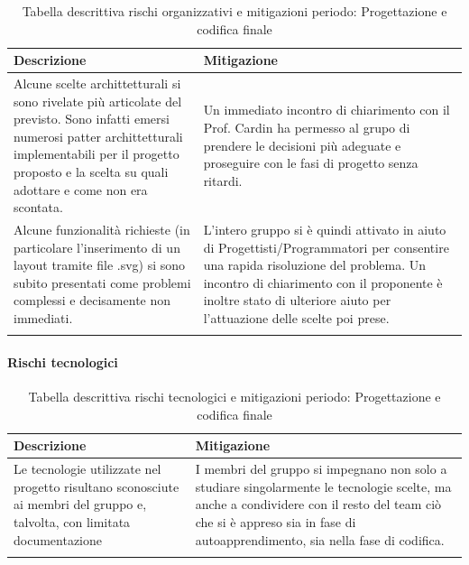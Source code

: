 \begin{center}


    \begin{xltabular}{\textwidth}{| X | X |}
                
        \textbf{\color{white} Descrizione} & \textbf{\color{white} Mitigazione}\\ 
        \endhead

        Alcune scelte archittetturali si sono rivelate più articolate del previsto. Sono infatti emersi numerosi patter archittetturali implementabili per il progetto proposto e la scelta su quali adottare e come non era scontata.  & Un immediato incontro di chiarimento con il Prof. Cardin ha permesso al grupo di prendere le decisioni più adeguate e proseguire con le fasi di progetto senza ritardi.  \\
        \hline

        Alcune funzionalità richieste (in particolare l'inserimento di un layout tramite file .svg) si sono subito presentati come problemi complessi e decisamente non immediati. & L'intero gruppo si è quindi attivato in aiuto di Progettisti/Programmatori per consentire una rapida risoluzione del problema. Un incontro di chiarimento con il proponente è inoltre stato di ulteriore aiuto per l'attuazione delle scelte poi prese.  \\
        \hline
        
        
        
        
            
        \caption{Tabella descrittiva rischi organizzativi e mitigazioni periodo: Progettazione e codifica finale}\label{tab:rischi_organizzativi_finale}
    \end{xltabular}
\end{center}

\paragraph{Rischi tecnologici}

\begin{center}
    \begin{xltabular}{\textwidth}{| X | X |}
                
        \textbf{\color{white} Descrizione} & \textbf{\color{white} Mitigazione}\\ 
        \endhead
    
        Le tecnologie utilizzate nel progetto risultano sconosciute ai membri del gruppo e, talvolta, con limitata documentazione &
        I membri del gruppo si impegnano non solo a studiare singolarmente le tecnologie scelte, ma anche a condividere con il resto del team ciò che si è appreso sia in fase di autoapprendimento, sia nella fase di codifica. \\
        \hline
            
        \caption{Tabella descrittiva rischi tecnologici e mitigazioni periodo: Progettazione e codifica finale}\label{tab:rischi_tecnologici_finale}
    \end{xltabular}
\end{center}


